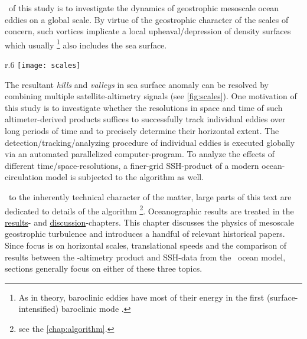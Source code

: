 

~of this study is to investigate the dynamics of geostrophic mesoscale ocean eddies on a global scale.
By virtue of the geostrophic character of the scales of concern, such vortices implicate a local upheaval/depression of density surfaces which usually \footnote{As in theory, baroclinic eddies have most of their energy in the first (surface-intensified) baroclinic mode \citep{olbers2012ocean}.} also includes the sea surface.
\begin{wrapfigure}{r}{.6\textwidth}
\texttt{[image: scales]}
\caption{Resolutions for model vs satellite. Modified version from \citet{olbers2012ocean}.}
\label{fig:scales}
\end{wrapfigure}
 The resultant \textit{hills} and \textit{valleys} in sea surface anomaly can be resolved by combining multiple satellite-altimetry signals (see \cref{fig:scales}). One motivation of this study is to investigate whether the resolutions in space and time of such altimeter-derived products suffices to successfully track individual eddies over long periods of time and to precisely determine their horizontal extent. The detection/tracking/analyzing procedure of individual eddies is executed globally via an automated parallelized computer-program. 
To analyze the effects of different time/space-resolutions, a finer-grid SSH-product of a modern ocean-circulation model is subjected to the algorithm as well.

~to the inherently technical character of the matter, large parts of this text are dedicated to details of the algorithm \footnote{see the \cref{chap:algorithm}.}. Oceanographic results are treated in the \href{chap:results}{results}- and \href{chap:discussion}{discussion}-chapters. This chapter discusses the physics of mesoscale geostrophic turbulence and introduces a handful of relevant historical papers. Since focus is on horizontal scales, translational speeds and the comparison of results between the \AVI-altimetry product and SSH-data from the \POP~ocean model, sections generally focus on either of these three topics.

